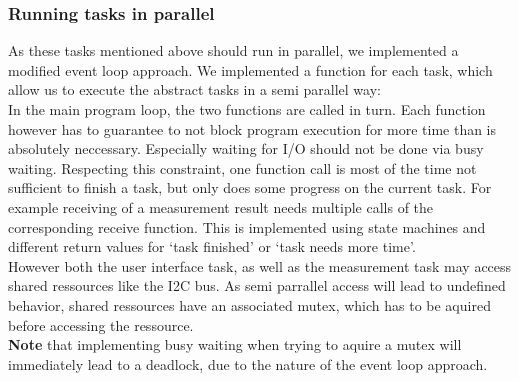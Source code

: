 \documentclass[a4paper]{scrreprt}
\begin{document}
\subsubsection{Running tasks in parallel}
As these tasks mentioned above should run in parallel, we implemented a modified event loop approach. We
implemented a function for each task, which allow us to execute the abstract tasks
in a semi parallel way:\\
In the main program loop, the two functions are called in turn. Each function however has to guarantee to
not block program execution for more time than is absolutely neccessary. Especially waiting for I/O
should not be done via busy waiting. Respecting this constraint, one function
call is most of the time not sufficient to finish a task, but only does some progress on the
current task. For example receiving of a measurement result needs multiple calls
of the corresponding receive function. This is implemented using state machines and different
return values for `task finished' or `task needs more time'.\\
However both the user interface task, as well as the measurement task may access shared ressources
like the I2C bus. As semi parrallel access will lead to undefined behavior, shared ressources
have an associated mutex, which has to be aquired before accessing the ressource.\\
\textbf{Note} that implementing
busy waiting when trying to aquire a mutex will immediately lead to a deadlock, due to the nature
of the event loop approach.
\end{document}
